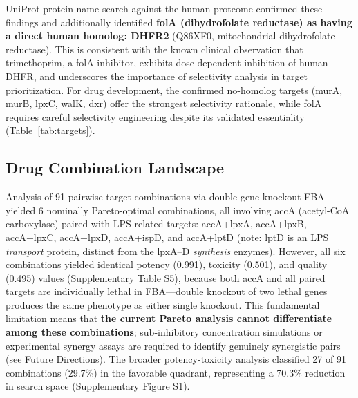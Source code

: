 \documentclass[12pt,a4paper]{article}
\begin{document}
UniProt protein name search against the human proteome confirmed these findings and additionally identified \textbf{folA (dihydrofolate reductase) as having a direct human homolog: DHFR2} (Q86XF0, mitochondrial dihydrofolate reductase). This is consistent with the known clinical observation that trimethoprim, a folA inhibitor, exhibits dose-dependent inhibition of human DHFR, and underscores the importance of selectivity analysis in target prioritization. For drug development, the confirmed no-homolog targets (murA, murB, lpxC, walK, dxr) offer the strongest selectivity rationale, while folA requires careful selectivity engineering despite its validated essentiality (Table~\ref{tab:targets}).

\subsection{Drug Combination Landscape}
Analysis of 91 pairwise target combinations via double-gene knockout FBA yielded 6 nominally Pareto-optimal combinations, all involving accA (acetyl-CoA carboxylase) paired with LPS-related targets: accA+lpxA, accA+lpxB, accA+lpxC, accA+lpxD, accA+ispD, and accA+lptD (note: lptD is an LPS \textit{transport} protein, distinct from the lpxA--D \textit{synthesis} enzymes). However, all six combinations yielded identical potency (0.991), toxicity (0.501), and quality (0.495) values (Supplementary Table S5), because both accA and all paired targets are individually lethal in FBA---double knockout of two lethal genes produces the same phenotype as either single knockout. This fundamental limitation means that \textbf{the current Pareto analysis cannot differentiate among these combinations}; sub-inhibitory concentration simulations or experimental synergy assays are required to identify genuinely synergistic pairs (see Future Directions). The broader potency-toxicity analysis classified 27 of 91 combinations (29.7\%) in the favorable quadrant, representing a 70.3\% reduction in search space (Supplementary Figure S1).
\end{document}
